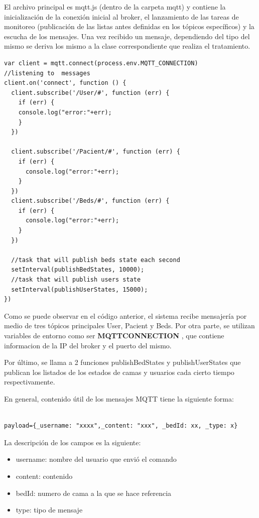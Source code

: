 El archivo principal es mqtt.js (dentro de la carpeta mqtt) y contiene la inicialización de la conexión inicial al broker, el lanzamiento de las tareas de monitoreo (publicación de las listas antes definidas en los tópicos específicos) y la escucha de los mensajes. Una vez recibido un mensaje, dependiendo del tipo del mismo se deriva los mismo a la clase correspondiente que realiza el tratamiento.


\begin{lstlisting}[caption=  Tareas ejecutadas por mqtt.js]
var client = mqtt.connect(process.env.MQTT_CONNECTION)
//listening to  messages
client.on('connect', function () {
  client.subscribe('/User/#', function (err) {
    if (err) {
    console.log("error:"+err);
    }
  })

  client.subscribe('/Pacient/#', function (err) {
    if (err) {      
      console.log("error:"+err);
    }
  })
  client.subscribe('/Beds/#', function (err) {
    if (err) {      
      console.log("error:"+err);
    }
  })

  //task that will publish beds state each second
  setInterval(publishBedStates, 10000);
  //task that will publish users state 
  setInterval(publishUserStates, 15000);
})
\end{lstlisting}

Como se puede observar en el código anterior, el sistema recibe mensajería por medio de tres tópicos principales User, Pacient y Beds. Por otra parte, se utilizan variables de entorno como ser \textbf{MQTT\textunderscore CONNECTION}  , que contiene informacion de la IP del broker y el puerto del mismo.

Por último, se llama a 2 funciones publishBedStates y publishUserStates que publican los listados de los estados de camas y usuarios cada cierto tiempo respectivamente.




En general, contenido útil de los mensajes MQTT tiene la siguiente forma:

\begin{lstlisting}[caption=  Formato mensaje MQTT]

payload={_username: "xxxx",_content: "xxx", _bedId: xx, _type: x}

\end{lstlisting}

La descripción de los campos es la siguiente:
\begin{itemize}
\item \textunderscore username: nombre del usuario que envió el comando
\item \textunderscore content: contenido
\item \textunderscore bedId: numero de cama a la que se hace referencia
\item \textunderscore type: tipo de mensaje
\end{itemize}

